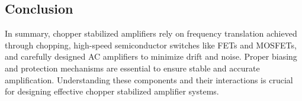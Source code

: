 \subsection{Conclusion}
In summary, chopper stabilized amplifiers rely on frequency translation achieved through chopping, high-speed semiconductor switches like FETs and MOSFETs, and carefully designed AC amplifiers to minimize drift and noise. Proper biasing and protection mechanisms are essential to ensure stable and accurate amplification. Understanding these components and their interactions is crucial for designing effective chopper stabilized amplifier systems.
